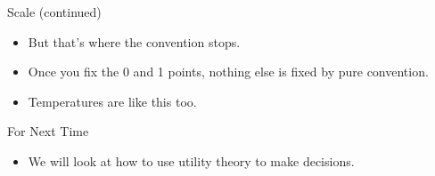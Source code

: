 \documentclass[
  ignorenonframetext,
]{beamer}
\providecommand{\tightlist}{%
  \setlength{\itemsep}{0pt}\setlength{\parskip}{0pt}}
\renewcommand{\,}{\text{, }}
\begin{document}
\begin{frame}{Scale (continued)}
\protect\hypertarget{scale-continued}{}
\begin{itemize}
\tightlist
\item
  But that's where the convention stops.
\item
  Once you fix the 0 and 1 points, nothing else is fixed by pure
  convention.
\item
  Temperatures are like this too.
\end{itemize}
\end{frame}

\begin{frame}{For Next Time}
\protect\hypertarget{for-next-time}{}
\begin{itemize}
\tightlist
\item
  We will look at how to use utility theory to make decisions.
\end{itemize}
\end{frame}
\end{document}
